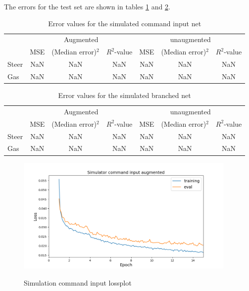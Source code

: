 \documentclass[a4paper]{article}
\begin{document}
The errors for the test set are shown in tables \ref{tab:error_command_aug} and \ref{tab:error_command_nonaug}.%
\begin{table}[H]
  \centering
  \caption{Error values for the simulated command input net}
  \begin{tabular}{lccc|ccc}
    &\multicolumn{3}{c|}{Augmented} & \multicolumn{3}{c}{unaugmented} \\
    & MSE & (Median error)$^2$ & $R^2$-value & MSE & (Median error)$^2$ & $R^2$-value\\ \hline
    Steer & NaN & NaN & NaN & NaN & NaN & NaN \\
    Gas & NaN & NaN & NaN & NaN & NaN & NaN
  \end{tabular}
  \label{tab:error_command_aug}
\end{table}
\begin{table}[H]
  \centering
  \caption{Error values for the simulated branched net}
  \begin{tabular}{lccc|ccc}
    &\multicolumn{3}{c|}{Augmented} & \multicolumn{3}{c}{unaugmented} \\
    & MSE & (Median error)$^2$ & $R^2$-value & MSE & (Median error)$^2$ & $R^2$-value\\ \hline
    Steer & NaN & NaN & NaN & NaN & NaN & NaN \\
    Gas & NaN & NaN & NaN & NaN & NaN & NaN
  \end{tabular}
  \label{tab:error_command_nonaug}
\end{table}
\begin{figure}[!htbp]
  \centering
  \includegraphics[width=0.95\textwidth]{figures/sim_command_input_aug_lossplot}
  \label{fig:augmented_command_loss}
  \caption{Simulation command input lossplot}
\end{figure}
\end{document}
